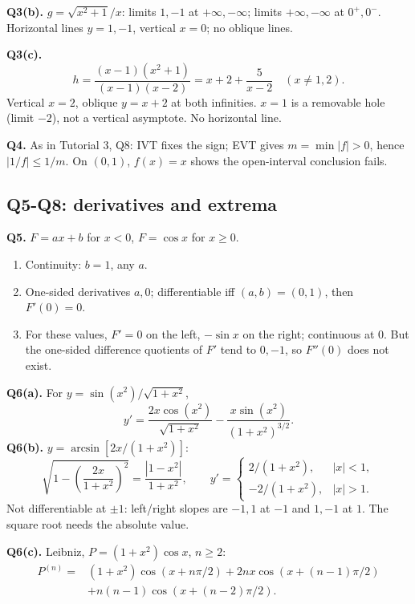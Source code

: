 \documentclass[11pt,letterpaper]{article}
\begin{document}
\textbf{Q3(b).} \(g=\sqrt{x^2+1}/x\): limits \(1,-1\) at
\(+\infty,-\infty\); limits \(+\infty,-\infty\) at \(0^+,0^-\).
Horizontal lines \(y=1,-1\), vertical \(x=0\); no oblique lines.

\textbf{Q3(c).} \[
h=\frac{(x-1)(x^2+1)}{(x-1)(x-2)}=x+2+\frac5{x-2}\quad(x\ne1,2).
\] Vertical \(x=2\), oblique \(y=x+2\) at both infinities. \(x=1\) is a
removable hole (limit \(-2\)), not a vertical asymptote. No horizontal
line.

\textbf{Q4.} As in Tutorial 3, Q8: IVT fixes the sign; EVT gives
\(m=\min|f|>0\), hence \(|1/f|\le1/m\). On \((0,1)\), \(f(x)=x\) shows
the open-interval conclusion fails.

\subsection{Q5-Q8: derivatives and
extrema}\label{q5-q8-derivatives-and-extrema}

\textbf{Q5.} \(F=ax+b\) for \(x<0\), \(F=\cos x\) for \(x\ge0\).

\begin{enumerate}
\def\labelenumi{(\alph{enumi})}
\item
  Continuity: \(b=1\), any \(a\).
\item
  One-sided derivatives \(a,0\); differentiable iff \((a,b)=(0,1)\),
  then \(F'(0)=0\).
\item
  For these values, \(F'=0\) on the left, \(-\sin x\) on the right;
  continuous at \(0\). But the one-sided difference quotients of \(F'\)
  tend to \(0,-1\), so \(F''(0)\) does not exist.
\end{enumerate}

\textbf{Q6(a).} For \(y=\sin(x^2)/\sqrt{1+x^2}\), \[
y'=\frac{2x\cos(x^2)}{\sqrt{1+x^2}}-\frac{x\sin(x^2)}{(1+x^2)^{3/2}}.
\] \textbf{Q6(b).} \(y=\arcsin[2x/(1+x^2)]\): \[
\sqrt{1-\left(\frac{2x}{1+x^2}\right)^2}=\frac{|1-x^2|}{1+x^2},\qquad
y'=\begin{cases}2/(1+x^2),&|x|<1,\\-2/(1+x^2),&|x|>1.\end{cases}
\] Not differentiable at \(\pm1\): left/right slopes are \(-1,1\) at
\(-1\) and \(1,-1\) at \(1\). The square root needs the absolute value.

\textbf{Q6(c).} Leibniz, \(P=(1+x^2)\cos x\), \(n\ge2\): \[
\begin{aligned}
P^{(n)}={}&(1+x^2)\cos(x+n\pi/2)+2nx\cos(x+(n-1)\pi/2)\\
&+n(n-1)\cos(x+(n-2)\pi/2).
\end{aligned}
\]
\end{document}
